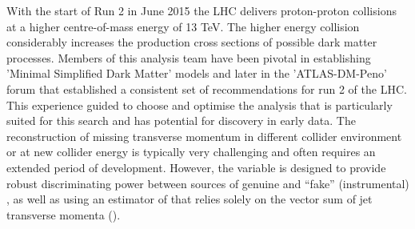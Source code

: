 With the start of Run 2 in June 2015 the LHC delivers proton-proton collisions at a higher centre-of-mass
energy of 13 TeV. The higher energy collision considerably increases the production cross sections of possible dark matter processes.
Members of this analysis team have been pivotal in establishing 'Minimal Simplified Dark Matter' models and later in the 'ATLAS-DM-Peno' forum that established a consistent set of recommendations for run 2 of the LHC. This experience guided to choose and optimise the \alphat analysis that is particularly suited for this search and has potential for
discovery in early data. The reconstruction of missing transverse momentum in different collider 
environment or at new collider energy is typically very challenging and often requires an extended period of
development. However, the \alphat variable is designed to provide robust discriminating power between sources of genuine and ``fake''
(\eg instrumental) \met, as well as using an estimator of \met that
relies solely on the vector sum of jet transverse momenta (\mht).




